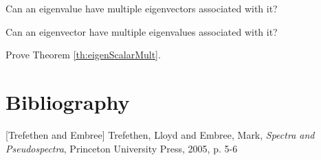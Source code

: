 \documentclass{ximera}
\begin{document}
\begin{problem}\label{prob:eigenmultchoice}
Can an eigenvalue have multiple eigenvectors associated with it? 
\begin{multipleChoice}
    \end{multipleChoice}
    
 Can an eigenvector have multiple eigenvalues associated with it?
 \begin{multipleChoice}
    \end{multipleChoice}
\end{problem}

\begin{problem}\label{prob:eigenScalarMult}
    Prove Theorem \ref{th:eigenScalarMult}.
\end{problem}

\section*{Bibliography}
[Trefethen and  Embree] Trefethen, Lloyd and Embree, Mark, {\it Spectra and Pseudospectra}, Princeton University Press, 2005, p. 5-6
\end{document}

